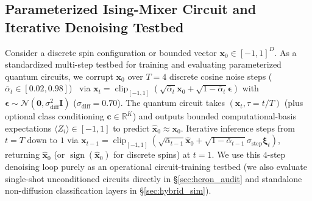 \documentclass[11pt]{article}
\begin{document}
\subsection{Parameterized Ising-Mixer Circuit and Iterative Denoising Testbed}
\label{sec:denoiser}
Consider a discrete spin configuration or bounded vector $\mathbf{x}_0 \in [-1,1]^D$. As a standardized multi-step testbed for training and evaluating parameterized quantum circuits, we corrupt $\mathbf{x}_0$ over $T{=}4$ discrete cosine noise steps ($\bar{\alpha}_t \in [0.02, 0.98]$)~\cite{sohldickstein2015,ho2020ddpm} via $\mathbf{x}_t = \operatorname{clip}_{[-1,1]}(\sqrt{\bar{\alpha}_t}\mathbf{x}_0 + \sqrt{1-\bar{\alpha}_t}\boldsymbol{\epsilon})$ with $\boldsymbol{\epsilon}\sim\mathcal{N}(\mathbf{0}, \sigma_{\text{diff}}^2\mathbf{I})$ ($\sigma_{\text{diff}}{=}0.70$). The quantum circuit takes $(\mathbf{x}_t, \tau{=}t/T)$ (plus optional class conditioning $\mathbf{c}\in\mathbb{R}^K$) and outputs bounded computational-basis expectations $\langle Z_i \rangle \in [-1,1]$ to predict $\hat{\mathbf{x}}_0 \approx \mathbf{x}_0$. Iterative inference steps from $t{=}T$ down to $1$ via $\mathbf{x}_{t-1} = \operatorname{clip}_{[-1,1]}(\sqrt{\bar{\alpha}_{t-1}}\hat{\mathbf{x}}_0 + \sqrt{1-\bar{\alpha}_{t-1}}\sigma_{\text{step}}\boldsymbol{\xi}_t)$, returning $\hat{\mathbf{x}}_0$ (or $\operatorname{sign}(\hat{\mathbf{x}}_0)$ for discrete spins) at $t{=}1$. We use this $4$-step denoising loop purely as an operational circuit-training testbed (we also evaluate single-shot unconditioned circuits directly in \S\ref{sec:heron_audit} and standalone non-diffusion classification layers in \S\ref{sec:hybrid_sim}).
\end{document}
